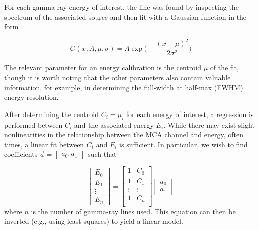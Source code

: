 For each gamma-ray energy of interest, the line was found by inspecting the spectrum of
the associated source and then fit with a Gaussian function in the form

\begin{equation}
G(x; A, \mu, \sigma) = A\exp\bigg(-\frac{(x-\mu)^2}{2\sigma^2}\bigg)
\end{equation}

The relevant parameter for an energy calibration is the centroid $\mu$ of the fit,
though it is worth noting that the other parameters also contain valuable information,
for example, in determining the full-width at half-max (FWHM) energy resolution.

After determining the centroid $C_i = \mu_i$ for each energy of interest, a
regression is performed between $C_i$ and the associated energy $E_i$. While there
may exist slight nonlinearities in the relationship between the MCA channel and
energy, often times, a linear fit between $C_i$ and $E_i$ is sufficient.
In particular, we wish to find coefficients
$\vec{a} = \begin{bmatrix}a_0, a_1 \end{bmatrix}$ such that

\begin{equation}
    \begin{bmatrix}
        E_0 \\ E_1 \\ \vdots \\ E_n
    \end{bmatrix} =
    \begin{bmatrix}
        1 & C_0 \\
        1 & C_1 \\
        \vdots & \vdots \\
        1 & C_n \\
    \end{bmatrix}
    \begin{bmatrix}
        a_0 \\ a_1
    \end{bmatrix}
\end{equation}
where $n$ is the number of gamma-ray lines used. This equation can then be
inverted (e.g., using least squares) to yield a linear model.
